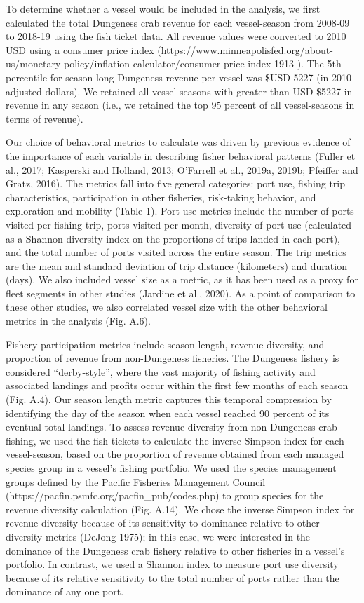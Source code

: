 \documentclass[]{elsarticle} %
\begin{document}
To determine whether a vessel would be included in the analysis, we
first calculated the total Dungeness crab revenue for each vessel-season
from 2008-09 to 2018-19 using the fish ticket data. All revenue values
were converted to 2010 USD using a consumer price index
(https://www.minneapolisfed.org/about-us/monetary-policy/inflation-calculator/consumer-price-index-1913-).
The 5th percentile for season-long Dungeness revenue per vessel was
\$USD 5227 (in 2010-adjusted dollars). We retained all vessel-seasons
with greater than USD \$5227 in revenue in any season (i.e., we retained
the top 95 percent of all vessel-seasons in terms of revenue).

Our choice of behavioral metrics to calculate was driven by previous
evidence of the importance of each variable in describing fisher
behavioral patterns (Fuller et al., 2017; Kasperski and Holland, 2013;
O'Farrell et al., 2019a, 2019b; Pfeiffer and Gratz, 2016). The metrics
fall into five general categories: port use, fishing trip
characteristics, participation in other fisheries, risk-taking behavior,
and exploration and mobility (Table 1). Port use metrics include the
number of ports visited per fishing trip, ports visited per month,
diversity of port use (calculated as a Shannon diversity index on the
proportions of trips landed in each port), and the total number of ports
visited across the entire season. The trip metrics are the mean and
standard deviation of trip distance (kilometers) and duration (days). We
also included vessel size as a metric, as it has been used as a proxy
for fleet segments in other studies (Jardine et al., 2020). As a point
of comparison to these other studies, we also correlated vessel size
with the other behavioral metrics in the analysis (Fig. A.6).

Fishery participation metrics include season length, revenue diversity,
and proportion of revenue from non-Dungeness fisheries. The Dungeness
fishery is considered ``derby-style'', where the vast majority of
fishing activity and associated landings and profits occur within the
first few months of each season (Fig. A.4). Our season length metric
captures this temporal compression by identifying the day of the season
when each vessel reached 90 percent of its eventual total landings. To
assess revenue diversity from non-Dungeness crab fishing, we used the
fish tickets to calculate the inverse Simpson index for each
vessel-season, based on the proportion of revenue obtained from each
managed species group in a vessel's fishing portfolio. We used the
species management groups defined by the Pacific Fisheries Management
Council (https://pacfin.psmfc.org/pacfin\_pub/codes.php) to group
species for the revenue diversity calculation (Fig. A.14). We chose the
inverse Simpson index for revenue diversity because of its sensitivity
to dominance relative to other diversity metrics (DeJong 1975); in this
case, we were interested in the dominance of the Dungeness crab fishery
relative to other fisheries in a vessel's portfolio. In contrast, we
used a Shannon index to measure port use diversity because of its
relative sensitivity to the total number of ports rather than the
dominance of any one port.
\end{document}
